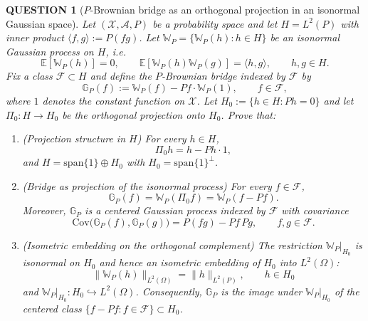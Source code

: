 \documentclass[12pt]{article}
\renewcommand{\(}{\left(}%
\renewcommand{\)}{\right)}%
\renewcommand{\[}{\left[}%
\renewcommand{\]}{\right]}%
\newtheorem{question}{QUESTION}[section]}
\begin{document}
\begin{question}[$P$-Brownian bridge as an orthogonal projection in an isonormal Gaussian space]
Let $(\mathcal X,\mathcal A,P)$ be a probability space and let $H=L^2(P)$ with inner product $\langle f,g\rangle:=P(fg)$. Let $\mathbb W_P=\{\mathbb W_P(h):h\in H\}$ be an isonormal Gaussian process on $H$, i.e.
\begin{equation*}
\mathbb E[\mathbb W_P(h)]=0,\qquad 
\mathbb E[\mathbb W_P(h)\mathbb W_P(g)]=\langle h,g\rangle,\qquad h,g\in H.
\end{equation*}
Fix a class $\mathcal F\subset H$ and define the $P$-Brownian bridge indexed by $\mathcal F$ by
\begin{equation*}
\mathbb G_P(f):=\mathbb W_P(f)-Pf\cdot \mathbb W_P(1),\qquad f\in\mathcal F,
\end{equation*}
where $1$ denotes the constant function on $\mathcal X$.
Let $H_0:=\{h\in H:Ph=0\}$ and let $\Pi_0:H\to H_0$ be the orthogonal projection onto $H_0$.
Prove that:
\begin{enumerate}
\item (Projection structure in $H$) For every $h\in H$,
\begin{equation*}
\Pi_0 h = h-Ph\cdot 1,
\end{equation*}
and $H= \mathrm{span}\{1\}\oplus H_0$ with $H_0=\mathrm{span}\{1\}^\perp$.

\item (Bridge as projection of the isonormal process) For every $f\in\mathcal F$,
\begin{equation*}
\mathbb G_P(f)=\mathbb W_P(\Pi_0 f)=\mathbb W_P(f-Pf).
\end{equation*}
Moreover, $\mathbb G_P$ is a centered Gaussian process indexed by $\mathcal F$ with covariance
\begin{equation*}
\mathrm{Cov}\big(\mathbb G_P(f),\mathbb G_P(g)\big)=P(fg)-Pf\,Pg,\qquad f,g\in\mathcal F.
\end{equation*}

\item (Isometric embedding on the orthogonal complement) The restriction $\mathbb W_P|_{H_0}$ is isonormal on $H_0$ and hence an isometric embedding of $H_0$ into $L^2(\Omega)$:
\begin{equation*}
\|\mathbb W_P(h)\|_{L^2(\Omega)}=\|h\|_{L^2(P)},\qquad h\in H_0
\end{equation*}
and $\mathbb W_P|_{H_0} : H_0 \hookrightarrow L^2(\Omega)$.
Consequently, $\mathbb G_P$ is the image under $\mathbb W_P|_{H_0}$ of the centered class $\{f-Pf:f\in\mathcal F\}\subset H_0$.
\end{enumerate}
\end{question}
\end{document}
